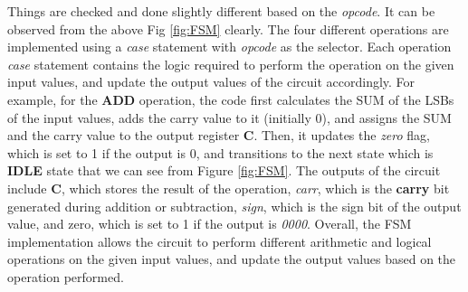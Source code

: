 Things are checked and done slightly different based on the \textit{opcode}.
It can be observed from the above Fig \ref{fig:FSM} clearly.
The four different operations are implemented using a \textit{case} statement with \textit{opcode} as the selector.
Each operation \textit{case} statement contains the logic required to perform the operation on the given input values,
and update the output values of the circuit accordingly.
For example, for the \textbf{ADD} operation, the code first calculates the SUM of the LSBs of the input values,
adds the carry value to it (initially 0),
and assigns the SUM and the carry value to the output register \textbf{C}.
Then, it updates the \textit{zero} flag, which is set to 1 if the output is 0,
and transitions to the next state which is \textbf{IDLE} state that we can see from Figure \ref{fig:FSM}.
The outputs of the circuit include \textbf{C}, which stores the result of the operation,
\textit{carr}, which is the \textbf{carry} bit generated during addition or subtraction,
\textit{sign}, which is the sign bit of the output value, and zero, which is set to 1 if the output is \textit{0000}.
Overall, the FSM implementation allows the circuit to perform different arithmetic and logical
operations on the given input values, and update the output values based on the operation performed.